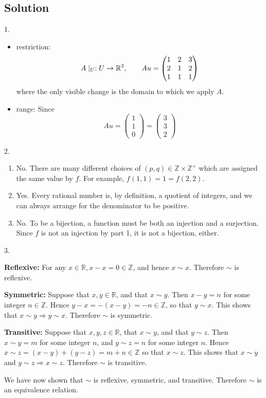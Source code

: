 \documentclass[12pt]{article}
\begin{document}
\subsection{Solution}
1. 
\begin{itemize}
	\item restriction: $$A \mid_U : U \to \mathbb{R}^3, \quad \quad Au = 
	\begin{pmatrix}
		 1 & 2 &3 \\ 
		 2 & 1 & 2 \\ 
		1 & 1 & 1
	\end{pmatrix}$$
	where the only visible change is the domain to which we apply $A$.
	\item range: Since 
	$$ A u = 	\begin{pmatrix}
		1  \\ 
		1 \\ 
	   0 
   \end{pmatrix}  = \begin{pmatrix}
	3  \\ 
	3 \\ 
   2 
\end{pmatrix} 
	 $$
\end{itemize}
2.
\begin{enumerate}
	\item No. There are many different choices of $(p, q) \in \mathbb{Z} \times \mathbb{Z}^+$ which are assigned the same value by $f$. For example, $f(1, 1) = 1 = f(2, 2)$.
	\item Yes. Every rational number is, by definition, a quotient of integers, and we	can always arrange for the denominator to be positive.
	\item No. To be a bijection, a function must be both an injection and a surjection.	Since $f$ is not an injection by part 1, it is not a bijection, either.
\end{enumerate}
3. 
\par \textbf{Ref\mbox{l}exive:} For any $x \in \mathbb{R}, x - x = 0 \in \mathbb{Z}$, and hence $x \sim x$. Therefore $\sim$ is reflexive.
\par \textbf{Symmetric:} Suppose that $x, y \in \mathbb{R}$, and that $x \sim y$. Then $x - y = n$ for some integer $n \in \mathbb{Z}$. Hence $y - x = -(x - y) = -n \in \mathbb{Z}$, so that $y \sim x$. This shows that $x \sim y \Rightarrow y \sim x$. Therefore $\sim$ is symmetric.
\par \textbf{Transitive:} Suppose that $x, y, z \in \mathbb{R}$, that $x \sim y$, and that $y \sim z$. Then $x \sim y = m$ for some integer $n$, and $y \sim z = n$ for some integer $n$. Hence $x \sim z = (x - y) + (y - z) = m + n \in \mathbb{Z}$ so that $x \sim z$. This shows that $x \sim y$ and $y \sim z \Rightarrow x \sim z$. Therefore $\sim$ is transitive.
\par We have now shown that $\sim$ is reflexive, symmetric, and transitive. Therefore $\sim$ is an equivalence relation.
\end{document}
